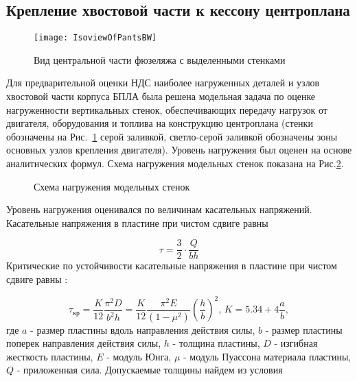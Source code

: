  \subsection{Крепление хвостовой части к кессону центроплана} 
\label{sec:pants}
\begin{figure}[H]
\centering
\texttt{[image: IsoviewOfPantsBW]}
\caption{Вид центральной части фюзеляжа с выделенными стенками}
\label{fig:IsoviewOfPants}
\end{figure}

Для предварительной оценки НДС наиболее нагруженных деталей и узлов хвостовой части корпуса БПЛА была решена модельная задача по оценке нагруженности вертикальных стенок, обеспечивающих передачу нагрузок от двигателя, оборудования и топлива на конструкцию центроплана (стенки обозначены на Рис.~\ref{fig:IsoviewOfPants} серой заливкой, светло-серой заливкой обозначены зоны основных узлов крепления двигателя). Уровень нагружения был оценен на основе аналитических формул. Схема нагружения модельных стенок показана на Рис.\ref{fig:IsoviewOfPantsModel}.

\begin{figure}[H]
\centering

\caption{Схема нагружения модельных стенок}
\label{fig:IsoviewOfPantsModel}
\end{figure}

%


Уровень нагружения оценивался по величинам касательных напряжений. Касательные напряжения в пластине при чистом сдвиге равны

\begin{equation}
\tau=\frac{3}{2}\cdot\frac{Q}{bh}
\end{equation}
Критические по устойчивости касательные напряжения в пластине при чистом сдвиге равны \cite{Volmir}:

\begin{equation}
\tau_\text{кр}=\frac{K}{12}\frac{\pi^2D}{b^2h} = \frac{K}{12}\frac{\pi^2E}{(1-\mu^2)}\left(\frac{h}{b}\right)^2,\, K=5.34 + 4\frac{a}{b},
\end{equation}
где $a$ - размер пластины вдоль направления действия силы, $b$ - размер пластины поперек направления действия силы, $h$ - толщина пластины, $D$ - изгибная жесткость пластины, $E$ - модуль Юнга, $\mu$ - модуль Пуассона материала пластины, $Q$ - приложенная сила.
Допускаемые толщины найдем из условия

